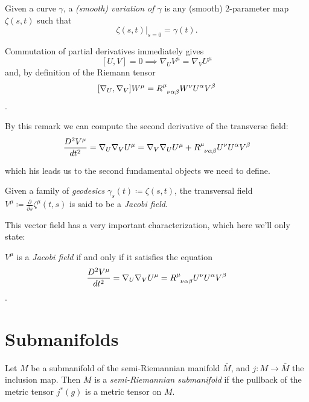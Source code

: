 \begin{definition}
	Given a curve \(\gamma\), a \emph{(smooth) variation of \(\gamma\)} is any (smooth) \(2\)-parameter map \(\zeta(s,t)\) such that 
	\[
	\left. \zeta(s, t) \right\vert_{s = 0} = \gamma(t).
	\]
\end{definition}



\begin{remark}
	Commutation of partial derivatives immediately gives 
	\[
	[U, V] = 0 \implies \nabla_U V^{\mu} = \nabla_V U^{\mu}
	\]
	and, by definition of the Riemann tensor
	\[
	[\nabla_U, \nabla_V]W^{\mu} = R\indices{^{\mu}_{\nu\alpha\beta}}W^{\nu}U^{\alpha}V^{\beta}
	\].
\end{remark}

By this remark we can compute the second derivative of the transverse field:
\[
\frac{D^2\tensor{V}{^\mu} }{dt^2} = \nabla_U\nabla_V U^{\mu} = \nabla_V\nabla_U U^{\mu} + R\indices{^{\mu}_{\nu\alpha\beta}}U^{\nu}U^{\alpha}V^{\beta}
\]

which his leads us to the second fundamental objects we need to define. 
\begin{definition}
	Given a family of \emph{geodesics} \(\gamma_s(t) \coloneqq \zeta(s,t)\), the transversal field \(V^{\mu} \coloneqq \frac{\partial}{\partial s} \zeta^{\mu}(t,s)\) is said to be a \emph{Jacobi field}.
\end{definition}

This vector field has a very important characterization, which here we'll only state:
\begin{lemma}
\(V^{\mu}\) is a \emph{Jacobi field} if and only if it satisfies the equation
	\[
	\frac{D^2\tensor{V}{^\mu} }{dt^2} = \nabla_U\nabla_V U^{\mu} =  R\indices{^{\mu}_{\nu\alpha\beta}}U^{\nu}U^{\alpha}V^{\beta}
	\].
\end{lemma}


\section{Submanifolds}
\label{sec:submanifolds}

\begin{definition}
	Let \(M\) be a submanifold of the semi-Riemannian manifold \(\bar{M}\), and \(j:M\rightarrow\bar{M}\) the inclusion map. Then \(M\) is a \emph{semi-Riemannian submanifold} if the pullback of the metric tensor \(j^*(g)\) is a metric tensor on \(M\).
\end{definition}

